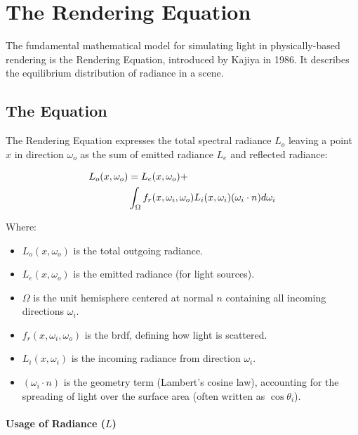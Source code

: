\section{The Rendering Equation}\label{sec:rendering-equation}

The fundamental mathematical model for simulating light in physically-based rendering is the Rendering Equation,
introduced by Kajiya in 1986\cite{10.1145/15886.15902}.
It describes the equilibrium distribution of radiance in a scene.

\subsection{The Equation}\label{subsec:the-equation}

The Rendering Equation expresses the total spectral radiance $L_o$
leaving a point $x$ in direction $\omega_o$ as the sum
of emitted radiance $L_e$ and reflected radiance:

\begin{align}
    L_o(x, \omega_o) &= L_e(x, \omega_o) + \notag \\
    & \int_{\Omega} f_r(x, \omega_i, \omega_o) L_i(x, \omega_i) (\omega_i \cdot n) d\omega_i
    \label{eq:rendering-equation}
\end{align}

Where:
\begin{itemize}
    \item $L_o(x, \omega_o)$ is the total outgoing radiance.
    \item $L_e(x, \omega_o)$ is the emitted radiance (for light sources).
    \item $\Omega$ is the unit hemisphere centered at normal $n$ containing all incoming directions $\omega_i$.
    \item $f_r(x, \omega_i, \omega_o)$ is the \gls{brdf}, defining how light is scattered.
    \item $L_i(x, \omega_i)$ is the incoming radiance from direction $\omega_i$.
    \item $(\omega_i \cdot n)$ is the geometry term (Lambert's cosine law),
        accounting for the spreading of light over the surface area (often written as $\cos\theta_i$).
\end{itemize}

\paragraph{Usage of Radiance ($L$)}

